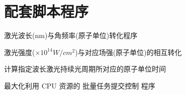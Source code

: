 \section{配套脚本程序}
激光波长(nm)与角频率(原子单位)转化程序 


激光强度($\times 10^{14} W/cm^2$)与对应场强(原子单位)的相互转化 



计算指定波长激光持续光周期所对应的原子单位时间 




最大化利用 CPU 资源的 批量任务提交控制 程序 


